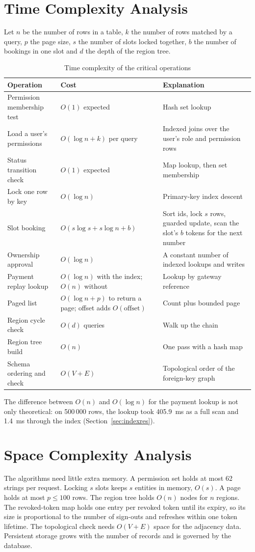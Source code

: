 \section{Time Complexity Analysis}
Let $n$ be the number of rows in a table, $k$ the number of rows matched by a query, $p$
the page size, $s$ the number of slots locked together, $b$ the number of bookings in one
slot and $d$ the depth of the region tree.

\begin{table}[H]
\centering\small
\caption{Time complexity of the critical operations}\label{tab:time}
\begin{tabularx}{\linewidth}{@{}p{4.3cm}p{2.9cm}X@{}}
\toprule \textbf{Operation} & \textbf{Cost} & \textbf{Explanation}\\ \midrule
Permission membership test & $O(1)$ expected & Hash set lookup\\
Load a user's permissions & $O(\log n + k)$ per query & Indexed joins over the user's role and permission rows\\
Status transition check & $O(1)$ expected & Map lookup, then set membership\\
Lock one row by key & $O(\log n)$ & Primary-key index descent\\
Slot booking & $O(s\log s + s\log n + b)$ & Sort ids, lock $s$ rows, guarded update, scan the slot's $b$ tokens for the next number\\
Ownership approval & $O(\log n)$ & A constant number of indexed lookups and writes\\
Payment replay lookup & $O(\log n)$ with the index; $O(n)$ without & Lookup by gateway reference\\
Paged list & $O(\log n + p)$ to return a page; offset adds $O(\text{offset})$ & Count plus bounded page\\
Region cycle check & $O(d)$ queries & Walk up the chain\\
Region tree build & $O(n)$ & One pass with a hash map\\
Schema ordering and check & $O(V+E)$ & Topological order of the foreign-key graph\\
\bottomrule
\end{tabularx}
\end{table}
The difference between $O(n)$ and $O(\log n)$ for the payment lookup is not only
theoretical: on 500\,000 rows, the lookup took 405.9~ms as a full scan and 1.4~ms through
the index (Section~\ref{sec:indexres}).

\section{Space Complexity Analysis}
The algorithms need little extra memory. A permission set holds at most 62 strings per
request. Locking $s$ slots keeps $s$ entities in memory, $O(s)$. A page holds at most $p\le
100$ rows. The region tree holds $O(n)$ nodes for $n$ regions. The revoked-token map holds one
entry per revoked token until its expiry, so its size is proportional to the number of
sign-outs and refreshes within one token lifetime. The topological check needs $O(V+E)$
space for the adjacency data. Persistent storage grows with the number of records and is
governed by the database.

